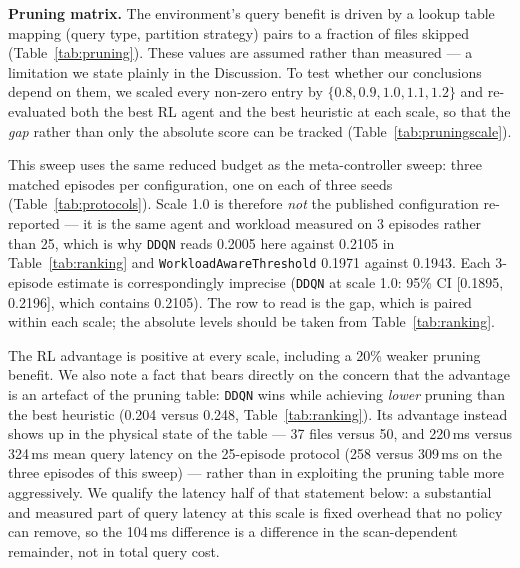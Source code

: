 \documentclass[fleqn,10pt]{wlscirep}
\newcommand{\ddqn}{\texttt{DDQN}}
\begin{document}
\textbf{Pruning matrix.}
The environment's query benefit is driven by a lookup table mapping
(query type, partition strategy) pairs to a fraction of files skipped
(Table~\ref{tab:pruning}). These values are assumed rather than measured
--- a limitation we state plainly in the Discussion. To test whether our
conclusions depend on them, we scaled every non-zero entry by
$\{0.8, 0.9, 1.0, 1.1, 1.2\}$ and re-evaluated both the best RL agent
and the best heuristic at each scale, so that the \emph{gap} rather than
only the absolute score can be tracked (Table~\ref{tab:pruningscale}).

This sweep uses the same reduced budget as the meta-controller sweep:
three matched episodes per configuration, one on each of three seeds
(Table~\ref{tab:protocols}). Scale 1.0 is therefore \emph{not} the
published configuration re-reported --- it is the same agent and
workload measured on 3 episodes rather than 25, which is why \ddqn{}
reads 0.2005 here against 0.2105 in Table~\ref{tab:ranking} and
\texttt{WorkloadAwareThreshold} 0.1971 against 0.1943. Each 3-episode
estimate is correspondingly imprecise (\ddqn{} at scale 1.0:
95\% CI [0.1895, 0.2196], which contains 0.2105). The row to read is the
gap, which is paired within each scale; the absolute levels should be
taken from Table~\ref{tab:ranking}.

The RL advantage is positive at every scale, including a 20\% weaker
pruning benefit. We also note a fact that bears directly on the concern
that the advantage is an artefact of the pruning table: \ddqn{} wins
while achieving \emph{lower} pruning than the best heuristic (0.204
versus 0.248, Table~\ref{tab:ranking}). Its advantage instead shows up
in the physical state of the table --- 37 files versus 50, and 220\,ms
versus 324\,ms mean query latency on the 25-episode protocol (258 versus
309\,ms on the three episodes of this sweep) --- rather than in
exploiting the pruning table more aggressively. We qualify the latency
half of that statement below: a substantial and measured part of query
latency at this scale is fixed overhead that no policy can remove, so
the 104\,ms difference is a difference in the scan-dependent remainder,
not in total query cost.
\end{document}
